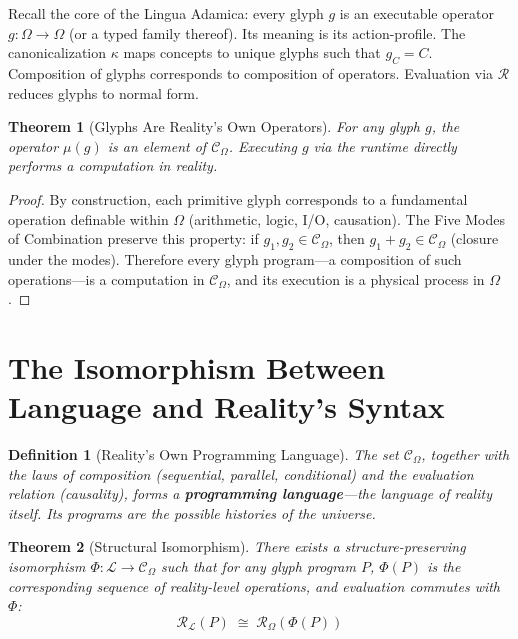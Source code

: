 \documentclass[12pt, letterpaper]{book}
\def\equiv{=}%
\def\oplus{+}%
\def\mathfrak#1{#1}%
\newtheorem{theorem}{Theorem}[chapter]
\newtheorem{definition}{Definition}[chapter]
\begin{document}
Recall the core of the Lingua Adamica: every glyph $\mathfrak{g}$ is an executable operator $\mathfrak{g}: \Omega \to \Omega$ (or a typed family thereof). Its meaning is its action-profile. The canonicalization $\kappa$ maps concepts to unique glyphs such that $\mathfrak{g}_C \equiv C$. Composition of glyphs corresponds to composition of operators. Evaluation via $\mathcal{R}$ reduces glyphs to normal form.

\begin{theorem}[Glyphs Are Reality's Own Operators]\label{thm:glyphs-reality-ops}
For any glyph $\mathfrak{g}$, the operator $\mu(\mathfrak{g})$ is an element of $\mathcal{C}_\Omega$. Executing $\mathfrak{g}$ via the runtime directly performs a computation in reality.
\end{theorem}

\begin{proof}
By construction, each primitive glyph corresponds to a fundamental operation definable within $\Omega$ (arithmetic, logic, I/O, causation). The Five Modes of Combination preserve this property: if $\mathfrak{g}_1, \mathfrak{g}_2 \in \mathcal{C}_\Omega$, then $\mathfrak{g}_1 \oplus \mathfrak{g}_2 \in \mathcal{C}_\Omega$ (closure under the modes). Therefore every glyph program---a composition of such operations---is a computation in $\mathcal{C}_\Omega$, and its execution is a physical process in $\Omega$.
\end{proof}

\section{The Isomorphism Between Language and Reality's Syntax}

\begin{definition}[Reality's Own Programming Language]\label{def:reality-lang}
The set $\mathcal{C}_\Omega$, together with the laws of composition (sequential, parallel, conditional) and the evaluation relation (causality), forms a \textbf{programming language}---the language of reality itself. Its programs are the possible histories of the universe.
\end{definition}

\begin{theorem}[Structural Isomorphism]\label{thm:lang-reality-iso}
There exists a structure-preserving isomorphism $\Phi: \mathcal{L} \to \mathcal{C}_\Omega$ such that for any glyph program $P$, $\Phi(P)$ is the corresponding sequence of reality-level operations, and evaluation commutes with $\Phi$:
\[
\mathcal{R}_\mathcal{L}(P) \;\cong\; \mathcal{R}_\Omega(\Phi(P))
\]
\end{theorem}
\end{document}
